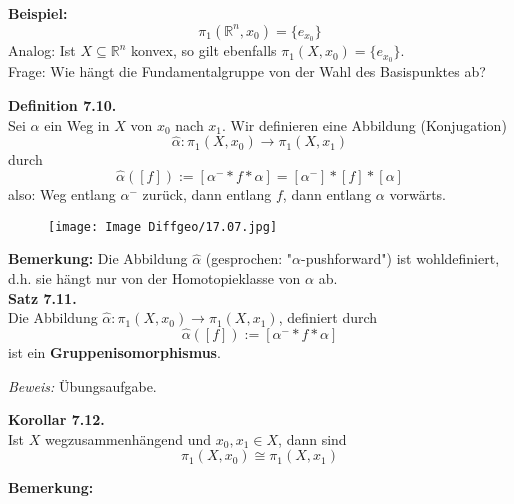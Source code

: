\documentclass[fleqn, 12pt, letterpaper]{article}
\begin{document}
\vspace{1em}
\textbf{Beispiel:}
\[
\pi_1(\mathbb{R}^n, x_0) = \{e_{x_0}\}
\]
{Analog:} Ist \( X \subseteq \mathbb{R}^n \) konvex, so gilt ebenfalls \( \pi_1(X, x_0) = \{e_{x_0}\} \).\\

{Frage:} Wie hängt die Fundamentalgruppe von der Wahl des Basispunktes ab?

\vspace{1em}
\textbf{Definition 7.10.} \\
Sei \( \alpha \) ein Weg in \( X \) von \( x_0 \) nach \( x_1 \). Wir definieren eine Abbildung (Konjugation)
\[
\hat{\alpha} : \pi_1(X, x_0) \to \pi_1(X, x_1)
\]
durch
\[
\hat{\alpha}([f]) := [\alpha^{-} * f * \alpha] = [\alpha^{-}]*[f]*[\alpha]
\]
also: Weg entlang \( \alpha^{-} \) zurück, dann entlang \( f \), dann entlang \( \alpha \) vorwärts.

  \begin{figure}[H]
    \centering
    \texttt{[image: Image Diffgeo/17.07.jpg]}
 \end{figure}

\vspace{1em}
\textbf{Bemerkung:} Die Abbildung \( \hat{\alpha} \) (gesprochen: "$\alpha$-pushforward") ist wohldefiniert, d.h. sie hängt nur von der Homotopieklasse von \( \alpha \) ab.\\

\textbf{Satz 7.11.} \\
Die Abbildung \( \hat{\alpha} : \pi_1(X, x_0) \to \pi_1(X, x_1) \), definiert durch
\[
\hat{\alpha}([f]) := [\alpha^{-} * f * \alpha]
\]
ist ein \textbf{Gruppenisomorphismus}.

\textit{Beweis:} Übungsaufgabe.

\vspace{1em}
\textbf{Korollar 7.12.} \\
Ist \( X \) wegzusammenhängend und \( x_0, x_1 \in X \), dann sind
\[
\pi_1(X, x_0) \cong \pi_1(X, x_1)
\]

\textbf{Bemerkung:}
\end{document}
